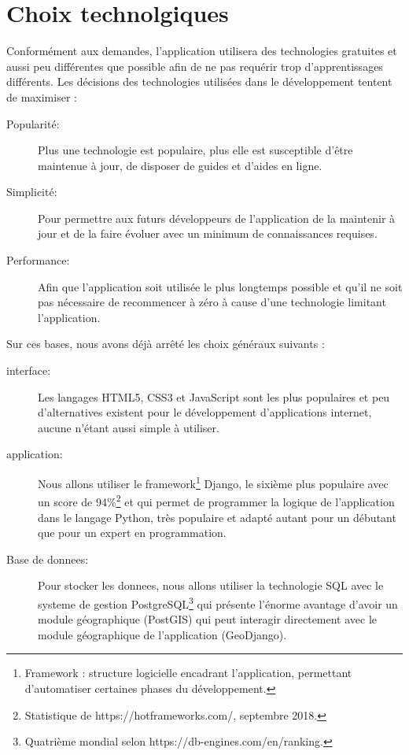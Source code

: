\documentclass[a4paper, 11pt]{article}
\begin{document}
\section{Choix technolgiques}
  Conformément aux demandes, l'\gls{application} utilisera des technologies gratuites et aussi peu différentes que possible afin de ne pas requérir trop d'apprentissages différents. Les décisions des technologies utilisées dans le développement tentent de maximiser :
  \begin{description}
    \item[Popularité:] Plus une technologie est populaire, plus elle est susceptible d'être maintenue à jour, de disposer de guides et d'aides en ligne.
    \item[Simplicité:] Pour permettre aux futurs développeurs de l'\gls{application} de la maintenir à jour et de la faire évoluer avec un minimum de connaissances requises.
    \item[Performance:] Afin que l'\gls{application} soit utilisée le plus longtemps possible et qu'il ne soit pas nécessaire de recommencer à zéro à cause d'une technologie limitant l'\gls{application}.
  \end{description}

  Sur ces bases, nous avons déjà arrêté les choix généraux suivants :
  \begin{description}
    \item[\Ac{interface}:] Les langages HTML5, CSS3 et JavaScript sont les plus populaires et peu d'alternatives existent pour le développement d'\gls{application}s internet, aucune n'étant aussi simple à utiliser.
    \item[\Ac{application}:] Nous allons utiliser le framework\footnote{Framework : structure logicielle encadrant l'\gls{application}, permettant d'automatiser certaines phases du développement.} Django, le sixième plus populaire avec un score de 94\%\footnote{Statistique de https://hotframeworks.com/, septembre 2018.} et qui permet de programmer la logique de l'\gls{application} dans le langage Python, très populaire et adapté autant pour un débutant que pour un expert en programmation.
    \item[Base de \glspl{donnee}:] Pour stocker les \glspl{donnee}, nous allons utiliser la technologie SQL avec le \gls{systeme} de gestion PostgreSQL\footnote{Quatrième mondial selon https://db-engines.com/en/ranking.} qui présente l'énorme avantage d'avoir un module géographique (PostGIS) qui peut interagir directement avec le module géographique de l'\gls{application} (GeoDjango).
  \end{description}
\end{document}
